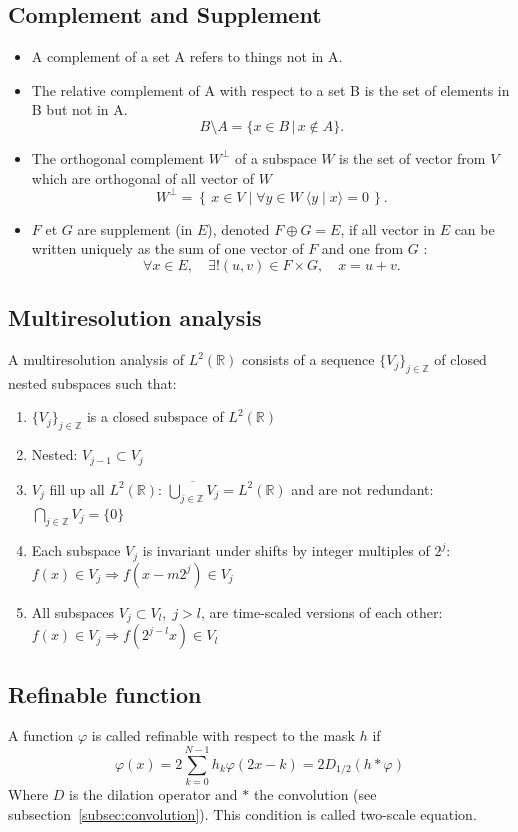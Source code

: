 \documentclass[twocolumn]{article}
\numberwithin{equation}{section}
\begin{document}
	\subsection{Complement and Supplement}
\begin{itemize}
	\item A complement of a set A refers to things not in A. 
	\item The relative complement of A with respect to a set B is the set of elements in B but not in A.
$$B \setminus A = \{ x\in B \, | \, x \notin A \}. $$
	\item The orthogonal complement $W^\bot$ of a subspace $W$ is the set of vector from $V$ which are orthogonal of all vector of $W$ 
$$W^\bot=\left\{\,x\in V\mid\forall y\in W\ \langle y \mid x \rangle = 0 \, \right\}.$$
	\item $F$ et $G$ are supplement (in $E$), denoted $F\oplus G = E$, if all vector in $E$ can be written uniquely as the sum of one vector of $F$ and one from $G$ :
$$\forall x\in E,\quad\exists ! (u,v)\in F\times G,\quad x=u+v.$$
\end{itemize}

	\subsection{Multiresolution analysis} \label{subsec:multiresolution_analysis}
A multiresolution analysis of $L^2(\mathbb R )$ consists of a sequence $\{V_j\}_{j\in \mathbb Z}$ of closed nested subspaces such that:
\begin{enumerate}[label=(\roman*)]
	\item $\{V_j\}_{j\in \mathbb Z}$ is a closed subspace of $L^2(\mathbb R )$
	\item Nested: $V_{j-1}\subset V_j$
	\item $V_j$ fill up all $L^2(\mathbb R )$: $\overline{\bigcup\limits_{j\in \mathbb Z} V_{j}}=L^2(\mathbb R )$ and are not redundant: $\bigcap\limits_{j\in \mathbb Z} V_{j}=\{0\}$
	\item Each subspace $V_j$ is invariant under shifts by integer multiples of $2^j$: $f(x)\in V_j \Rightarrow f(x-m2^{j}) \in V_j$
	\item All subspaces $V_j\subset V_l,\; j>l$, are time-scaled versions of each other:  $f(x)\in V_j  \Rightarrow f(2^{j-l}x) \in V_l$
\end{enumerate}

	\subsection{Refinable function} \label{subsec:refinable-function}
A function $\varphi$ is called refinable with respect to the mask $h$ if
$$\varphi(x)=2 \sum_{k=0}^{N-1} h_k \varphi(2 x-k)=2 D_{1/2} (h * \varphi)$$
Where $D$ is the dilation operator and $*$ the convolution (see subsection~\ref{subsec:convolution}). This condition is called two-scale equation.
	
\end{document}
